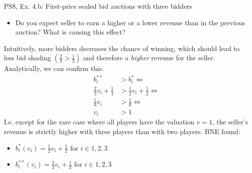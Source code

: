 \begin{frame}{PS8, Ex. 4.b: First-price sealed bid auctions with three bidders}
    \begin{itemize}
      \item[(b)] Do you expect seller to earn a higher or a lower revenue than in the previous auction? What is causing this effect?
    \end{itemize}
    \vspace{-8pt}
    \begin{multicols}{2}
    Intuitively, more bidders decreases the chance of winning, which should lead to less bid shading $\left(\frac{2}{3}>\frac{1}{2}\right)$ and therefore a \textit{higher} revenue for the seller.\\\medskip
    Analytically, we can confirm this:
    \begin{align*}
      b_i^{**}&>b_i^{*}\Leftrightarrow\\
      \frac{2}{3}v_i+\frac{1}{3}&>\frac{1}{2}v_i+\frac{1}{2}\Leftrightarrow\\
      \frac{1}{6}v_i&>\frac{1}{6}\Leftrightarrow\\
                 v_i&>1
    \end{align*}
    I.e. except for the rare case where all players have the valuation $v=1$, the seller's revenue  is strictly higher with three players than with two players.
    \vfill\null\columnbreak
    BNE found:
    \begin{itemize}
      \item[(3.a)] $b_i^{*}(v_i)=\frac{1}{2}v_i+\frac{1}{2}$ for $i\in1,2,3$
      \item[(4.a)] $b_i^{**}(v_i)=\frac{2}{3}v_i+\frac{1}{3}$ for $i\in1,2,3$
    \end{itemize}
    \vfill\null
    \end{multicols}
\end{frame}


